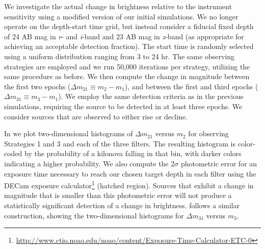 We investigate the actual change in brightness relative to the instrument sensitivity using a modified version of our initial simulations. We no longer operate on the depth-start time grid, but instead consider a fiducial fixed depth of 24 AB mag in {\em r}- and {\em i}-band and 23 AB mag in {\em z}-band (as appropriate for achieving an acceptable detection fraction). The start time is randomly selected using a uniform distribution ranging from 3 to 24 hr. The same observing strategies are employed and we run 50,000 iterations per strategy, utilizing the same procedure as before. We then compute the change in magnitude between the first two epochs ($\Delta m_{21} \equiv m_2 - m_1$), and between the first and third epochs ($\Delta m_{31} \equiv m_3 - m_1$). We employ the same detection criteria as in the previous simulations, requiring the source to be detected in at least three epochs. We consider sources that are observed to either rise or decline.

In  we plot two-dimensional histograms of $\Delta m_{21}$ versus $m_2$ for observing Strategies 1 and 3 and each of the three filters. The resulting histogram is color-coded by the probability of a kilonova falling in that bin, with darker colors indicating a higher probability. We also compute the $2\sigma$ photometric error for an exposure time necessary to reach our chosen target depth in each filter using the DECam exposure calculator\footnote{\singlespace \url{http://www.ctio.noao.edu/noao/content/Exposure-Time-Calculator-ETC-0}} (hatched region). Sources that exhibit a change in magnitude that is smaller than this photometric error will not produce a statistically significant detection of a change in brightness.  follows a similar construction, showing the two-dimensional histograms for $\Delta m_{31}$ versus $m_3$.

